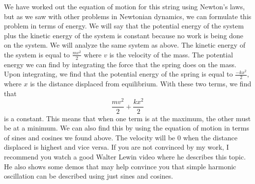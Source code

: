 We have worked out the equation of motion for this string using Newton’s laws, but as we saw with other problems in Newtonian dynamics, we can formulate this problem in terms of energy. We will say that the potential energy of the system plus the kinetic energy of the system is constant because no work is being done on the system.  We will analyze the same system as above. The kinetic energy of the system is equal to $\frac{mv^2}{2}$ where $v$ is the velocity of the mass. The potential energy we can find by integrating the force that the spring does on the mass. Upon integrating, we find that the potential energy of the spring is equal to $\frac{-kx^2}{2}$, where $x$ is the distance displaced from equilibrium. With these two terms, we find that $$\frac{mv^2}{2}+\frac{kx^2}{2}$$ is a constant. This means that when one term is at the maximum, the other must be at a minimum. We can also find this by using the equation of motion in terms of sines and cosines we found above. The velocity will be 0 when the distance displaced is highest and vice versa. If you are not convinced by my work, I recommend you watch a good Walter Lewin video where he describes this topic. He also shows some demos that may help convince you that simple harmonic oscillation can be described using just sines and cosines. 